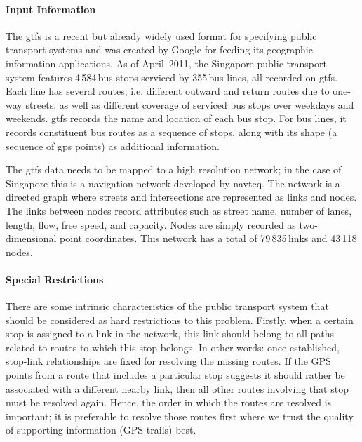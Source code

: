 \paragraph{Input Information}

The \gls{gtfs} is a recent but already widely used format for specifying public transport systems and was created by Google for feeding its geographic information applications. As of April~2011, the Singapore public transport system features 4\,584\,bus stops serviced by 355\,bus lines, all recorded on \gls{gtfs}. Each line has several routes, i.e. different outward and return routes due to one-way streets; as well as different coverage of serviced bus stops over weekdays and weekends. \gls{gtfs} records the name and location of each bus stop. For bus lines, it records constituent bus routes as a sequence of stops, along with its shape (a sequence of \gls{gps} points) as additional information. 

The \gls{gtfs} data needs to be mapped to a high resolution network; in the case of Singapore this is a navigation network developed by \gls{navteq}. The network is a directed graph where streets and intersections are represented as links and nodes. The links between nodes record attributes such as street name, number of lanes, length, flow, free speed, and capacity. Nodes are simply recorded as two-dimensional point coordinates. This network has a total of 79\,835\,links and 43\,118\,nodes.

\paragraph{Special Restrictions}

There are some intrinsic characteristics of the public transport system that should be considered as hard restrictions to this problem. Firstly, when a certain stop is assigned to a link in the network, this link should belong to all paths related to routes to which this stop belongs. In other words: once established, stop-link relationships are fixed for resolving the missing routes. If the \gls{GPS} points from a route that includes a particular stop suggests it should rather be associated with a different nearby link, then all other routes involving that stop must be resolved again. Hence, the order in which the routes are resolved is important; it is preferable to resolve those routes first where we trust the quality of supporting information (\eg \gls{GPS} trails) best.

